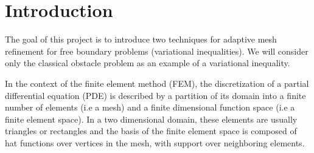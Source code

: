 \documentclass[12 pt]{report}
\begin{document}

\chapter{Introduction}

The goal of this project is to introduce two techniques for adaptive mesh refinement for free boundary problems (variational inequalities). We will consider only the classical obstacle problem as an example of a variational inequality. 

In the context of the finite element method (FEM), the discretization of a partial differential equation (PDE) is described by a partition of its domain into a finite number of elements (i.e a mesh) and a finite dimensional function space (i.e a finite element space). In a two dimensional domain, these elements are usually triangles or rectangles and the basis of the finite element space is composed of hat functions over vertices in the mesh, with support over neighboring elements. 
\end{document}
